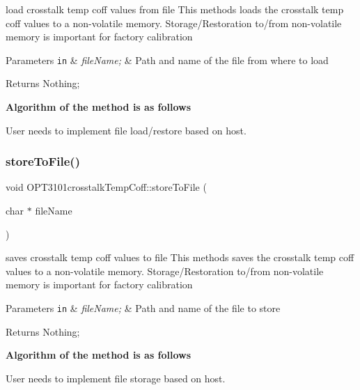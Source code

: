 load crosstalk temp coff values from file This methods loads the crosstalk temp coff values to a non-\/volatile memory. Storage/\+Restoration to/from non-\/volatile memory is important for factory calibration 


\begin{DoxyParams}[1]{Parameters}
\mbox{\tt in}  & {\em file\+Name;} & Path and name of the file from where to load \\
\hline
\end{DoxyParams}
\begin{DoxyReturn}{Returns}
Nothing; 
\end{DoxyReturn}
{\bfseries Algorithm of the method is as follows}
\begin{DoxyItemize}
\item User needs to implement file load/restore based on host. 
\end{DoxyItemize}\mbox{\label{class_o_p_t3101crosstalk_temp_coff_a8283a641699c42fe5232c2758ddfcd40}} 
\subsubsection{\texorpdfstring{store\+To\+File()}{storeToFile()}}
{\footnotesize\ttfamily void O\+P\+T3101crosstalk\+Temp\+Coff\+::store\+To\+File (\begin{DoxyParamCaption}\item[{char $\ast$}]{file\+Name }\end{DoxyParamCaption})}



saves crosstalk temp coff values to file This methods saves the crosstalk temp coff values to a non-\/volatile memory. Storage/\+Restoration to/from non-\/volatile memory is important for factory calibration 


\begin{DoxyParams}[1]{Parameters}
\mbox{\tt in}  & {\em file\+Name;} & Path and name of the file to store \\
\hline
\end{DoxyParams}
\begin{DoxyReturn}{Returns}
Nothing; 
\end{DoxyReturn}
{\bfseries Algorithm of the method is as follows}
\begin{DoxyItemize}
\item User needs to implement file storage based on host. 
\end{DoxyItemize}

